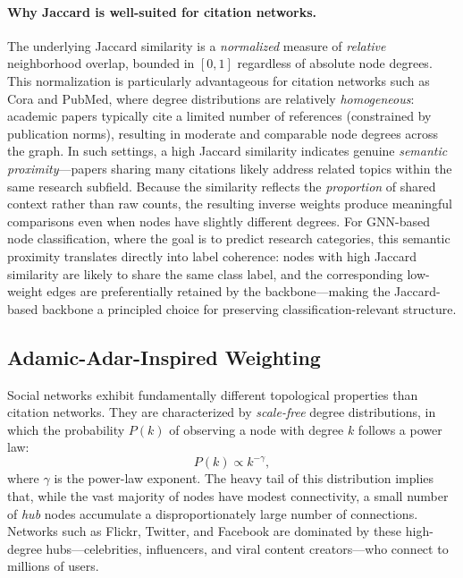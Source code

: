 \documentclass[conference]{IEEEtran}
\begin{document}
\paragraph{Why Jaccard is well-suited for citation networks.} The underlying Jaccard similarity is a \emph{normalized} measure of \emph{relative} neighborhood overlap, bounded in $[0, 1]$ regardless of absolute node degrees. This normalization is particularly advantageous for citation networks such as Cora and PubMed, where degree distributions are relatively \emph{homogeneous}: academic papers typically cite a limited number of references (constrained by publication norms), resulting in moderate and comparable node degrees across the graph. In such settings, a high Jaccard similarity indicates genuine \emph{semantic proximity}---papers sharing many citations likely address related topics within the same research subfield. Because the similarity reflects the \emph{proportion} of shared context rather than raw counts, the resulting inverse weights produce meaningful comparisons even when nodes have slightly different degrees. For GNN-based node classification, where the goal is to predict research categories, this semantic proximity translates directly into label coherence: nodes with high Jaccard similarity are likely to share the same class label, and the corresponding low-weight edges are preferentially retained by the backbone---making the Jaccard-based backbone a principled choice for preserving classification-relevant structure.

\subsection{Adamic-Adar-Inspired Weighting}\label{sec:adamic_adar}

Social networks exhibit fundamentally different topological properties than citation networks. They are characterized by \emph{scale-free} degree distributions, in which the probability $P(k)$ of observing a node with degree $k$ follows a power law:
\begin{equation}
    P(k) \propto k^{-\gamma},
    \label{eq:power_law}
\end{equation}
where $\gamma$ is the power-law exponent. The heavy tail of this distribution implies that, while the vast majority of nodes have modest connectivity, a small number of \emph{hub} nodes accumulate a disproportionately large number of connections. Networks such as Flickr, Twitter, and Facebook are dominated by these high-degree hubs---celebrities, influencers, and viral content creators---who connect to millions of users.
\end{document}
